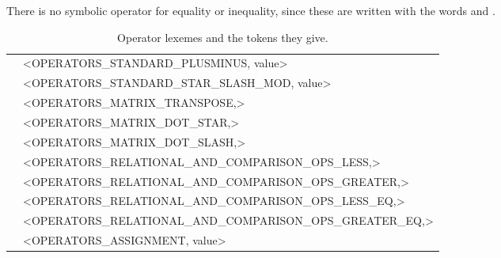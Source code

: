 There is no symbolic operator for equality or inequality, since these are
written with the words  and .

\begin{table}[H]
\centering
\footnotesize
\begin{tabular}{@{}ll@{}}
\code{+} \code{-} & \textless{}OPERATORS\_STANDARD\_PLUSMINUS, value\textgreater{} \\
\code{*} \code{/} \code{\%} & \textless{}OPERATORS\_STANDARD\_STAR\_SLASH\_MOD, value\textgreater{} \\
\code{\textquotesingle{}} & \textless{}OPERATORS\_MATRIX\_TRANSPOSE,\textgreater{} \\
\code{.*} & \textless{}OPERATORS\_MATRIX\_DOT\_STAR,\textgreater{} \\
\code{./} & \textless{}OPERATORS\_MATRIX\_DOT\_SLASH,\textgreater{} \\
\code{<} & \textless{}OPERATORS\_RELATIONAL\_AND\_COMPARISON\_OPS\_LESS,\textgreater{} \\
\code{>} & \textless{}OPERATORS\_RELATIONAL\_AND\_COMPARISON\_OPS\_GREATER,\textgreater{} \\
\code{<=} & \textless{}OPERATORS\_RELATIONAL\_AND\_COMPARISON\_OPS\_LESS\_EQ,\textgreater{} \\
\code{>=} & \textless{}OPERATORS\_RELATIONAL\_AND\_COMPARISON\_OPS\_GREATER\_EQ,\textgreater{} \\
\code{=} \code{+=} \code{-=} \code{*=} \code{/=} & \textless{}OPERATORS\_ASSIGNMENT, value\textgreater{} \\
\end{tabular}
\caption{Operator lexemes and the tokens they give.}
\label{tab:ops}
\end{table}

